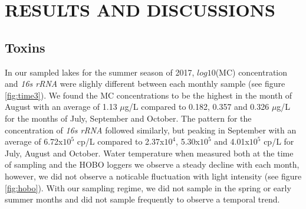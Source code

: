 \chapter{RESULTS AND DISCUSSIONS}
 
\section{Toxins}
In our sampled lakes for the summer season of 2017, $log10$(MC) concentration and \emph{16s rRNA} were slighly different between each monthly sample (see figure \ref{fig:time3}). We found the MC concentrations to be the highest in the month of August with an average of 1.13 $\mu$g/L compared to 0.182, 0.357 and 0.326 $\mu$g/L for the months of July, September and October. The pattern for the concentration of \emph{16s rRNA} followed similarly, but peaking in September with an average of 6.72x$10^5$ cp/L compared to 2.37x$10^4$, 5.30x$10^5$ and 4.01x$10^5$ cp/L for July, August and October. Water temperature when measured both at the time of sampling and the HOBO loggers we observe a steady decline with each month, however, we did not observe a noticable fluctuation with light intensity (see figure \ref{fig:hobo}). With our sampling regime, we did not sample in the spring or early summer months and did not sample frequently to observe a temporal trend. 


